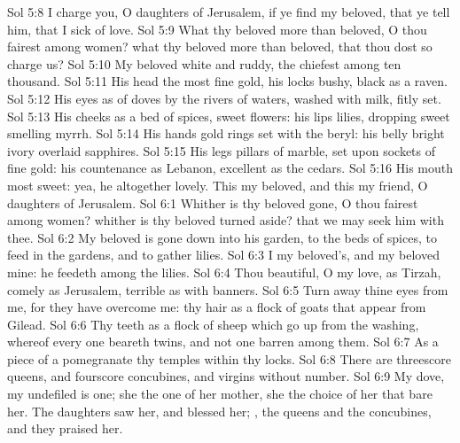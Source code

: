 \vs Sol 5:8 I charge you, O daughters of Jerusalem, if ye find my beloved, that ye tell him, that I  sick of love.
\vs Sol 5:9 What  thy beloved more than  beloved, O thou fairest among women? what  thy beloved more than  beloved, that thou dost so charge us?
\vs Sol 5:10 My beloved  white and ruddy, the chiefest among ten thousand.
\vs Sol 5:11 His head  the most fine gold, his locks  bushy,  black as a raven.
\vs Sol 5:12 His eyes  as  of doves by the rivers of waters, washed with milk,  fitly set.
\vs Sol 5:13 His cheeks  as a bed of spices,  sweet flowers: his lips  lilies, dropping sweet smelling myrrh.
\vs Sol 5:14 His hands  gold rings set with the beryl: his belly  bright ivory overlaid  sapphires.
\vs Sol 5:15 His legs  pillars of marble, set upon sockets of fine gold: his countenance  as Lebanon, excellent as the cedars.
\vs Sol 5:16 His mouth  most sweet: yea, he  altogether lovely. This  my beloved, and this  my friend, O daughters of Jerusalem.
\vs Sol 6:1 Whither is thy beloved gone, O thou fairest among women? whither is thy beloved turned aside? that we may seek him with thee.
\vs Sol 6:2 My beloved is gone down into his garden, to the beds of spices, to feed in the gardens, and to gather lilies.
\vs Sol 6:3 I  my beloved's, and my beloved  mine: he feedeth among the lilies.
\vs Sol 6:4 Thou  beautiful, O my love, as Tirzah, comely as Jerusalem, terrible as  with banners.
\vs Sol 6:5 Turn away thine eyes from me, for they have overcome me: thy hair  as a flock of goats that appear from Gilead.
\vs Sol 6:6 Thy teeth  as a flock of sheep which go up from the washing, whereof every one beareth twins, and  not one barren among them.
\vs Sol 6:7 As a piece of a pomegranate  thy temples within thy locks.
\vs Sol 6:8 There are threescore queens, and fourscore concubines, and virgins without number.
\vs Sol 6:9 My dove, my undefiled is  one; she  the  one of her mother, she  the choice  of her that bare her. The daughters saw her, and blessed her; , the queens and the concubines, and they praised her.
